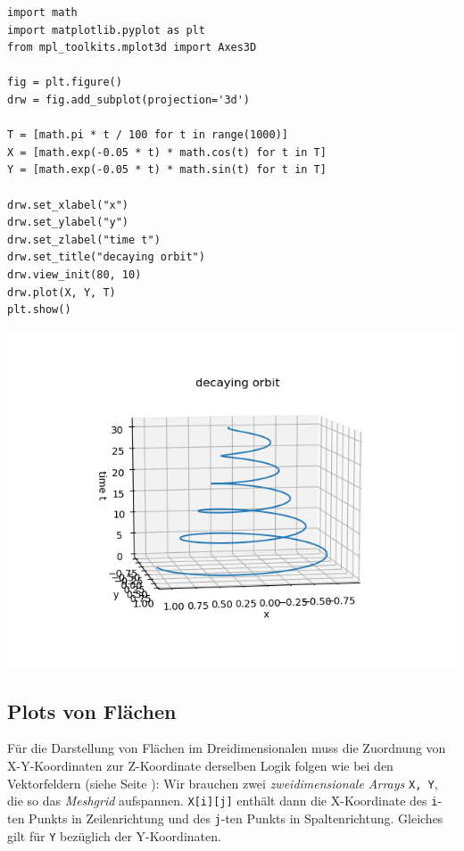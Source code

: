 \begin{codebox}
\begin{verbatim}
import math
import matplotlib.pyplot as plt
from mpl_toolkits.mplot3d import Axes3D

fig = plt.figure()
drw = fig.add_subplot(projection='3d')

T = [math.pi * t / 100 for t in range(1000)]
X = [math.exp(-0.05 * t) * math.cos(t) for t in T]
Y = [math.exp(-0.05 * t) * math.sin(t) for t in T]

drw.set_xlabel("x")
drw.set_ylabel("y")
drw.set_zlabel("time t")
drw.set_title("decaying orbit")
drw.view_init(80, 10)
drw.plot(X, Y, T)
plt.show()
\end{verbatim}
\end{codebox}
%
\begin{tcolorbox}[title=Ausgabe: 3D-Kurve]
\begin{center}
	\includegraphics[width=.7\linewidth]{./gfx/plt-orbit3D}
\end{center}
\end{tcolorbox}


\subsection{Plots von Flächen}
Für die Darstellung von Flächen im Dreidimensionalen muss die Zuordnung von X-Y-Koordinaten zur Z-Koordinate derselben Logik folgen wie bei den Vektorfeldern (siehe Seite \pageref{ssc:vecFields}): Wir brauchen zwei \emph{zweidimensionale Arrays} \texttt{X, Y}, die so das \emph{Meshgrid} aufspannen. \texttt{X[i][j]} enthält dann die X-Koordinate des \texttt{i}-ten Punkts in Zeilenrichtung und des \texttt{j}-ten Punkts in Spaltenrichtung. Gleiches gilt für \texttt{Y} bezüglich der Y-Koordinaten.

